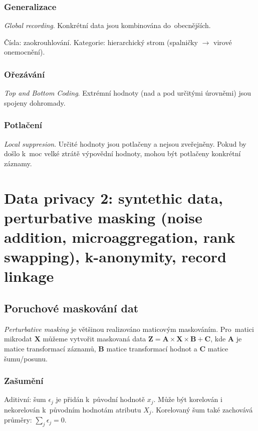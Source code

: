 \subsubsection*{Generalizace}

\emph{Global recording}.
Konkrétní data jsou kombinována do~obecnějších.

Čísla: zaokrouhlování.
Kategorie: hierarchický strom (spalničky $\rightarrow$ virové onemocnění).


\subsubsection*{Ořezávání}

\emph{Top and Bottom Coding}.
Extrémní hodnoty (nad a pod určitými úrovněmi) jsou spojeny dohromady.


\subsubsection*{Potlačení}

\emph{Local suppresion}.
Určité hodnoty jsou potlačeny a nejsou zveřejněny.
Pokud by došlo k~moc velké ztrátě výpovědní hodnoty, mohou být potlačeny konkrétní záznamy.



\clearpage
\section{Data privacy 2: syntethic data, perturbative masking (noise addition, microaggregation, rank swapping), k-anonymity, record linkage}


\subsection{Poruchové maskování dat}

\emph{Perturbative masking} je většinou realizováno maticovým maskováním.
Pro~matici mikrodat $\mathbf{X}$ můžeme vytvořit maskovaná data $\textbf{Z} = \textbf{A} \times \textbf{X} \times \mathbf{B} + \textbf{C}$, kde \textbf{A} je matice transformací záznamů, \textbf{B} matice transformací hodnot a \textbf{C} matice šumu/posunu.


\subsubsection*{Zašumění}

Aditivní: šum $\epsilon_j$ je přidán k~původní hodnotě $x_j$.
Může být korelován i nekorelován k~původním hodnotám atributu $X_j$.
Korelovaný šum také zachovává průměry: $\sum_j \epsilon_j = 0$.

